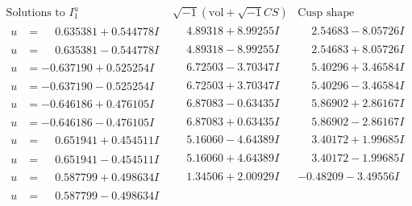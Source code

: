 \documentclass[1p]{elsarticle_modified}
\theoremstyle{definition}
\newcommand{\I}{\sqrt{-1}}
\begin{document}
$$\begin{array}{c|c|c}  
\text{Solutions to }I^u_{1}& \I (\text{vol} + \sqrt{-1}CS) & \text{Cusp shape}\\
 \hline 
\begin{aligned}
u &= \phantom{-}0.635381 + 0.544778 I\end{aligned}
 & \phantom{-}4.89318 + 8.99255 I & \phantom{-}2.54683 - 8.05726 I \\ \hline\begin{aligned}
u &= \phantom{-}0.635381 - 0.544778 I\end{aligned}
 & \phantom{-}4.89318 - 8.99255 I & \phantom{-}2.54683 + 8.05726 I \\ \hline\begin{aligned}
u &= -0.637190 + 0.525254 I\end{aligned}
 & \phantom{-}6.72503 - 3.70347 I & \phantom{-}5.40296 + 3.46584 I \\ \hline\begin{aligned}
u &= -0.637190 - 0.525254 I\end{aligned}
 & \phantom{-}6.72503 + 3.70347 I & \phantom{-}5.40296 - 3.46584 I \\ \hline\begin{aligned}
u &= -0.646186 + 0.476105 I\end{aligned}
 & \phantom{-}6.87083 - 0.63435 I & \phantom{-}5.86902 + 2.86167 I \\ \hline\begin{aligned}
u &= -0.646186 - 0.476105 I\end{aligned}
 & \phantom{-}6.87083 + 0.63435 I & \phantom{-}5.86902 - 2.86167 I \\ \hline\begin{aligned}
u &= \phantom{-}0.651941 + 0.454511 I\end{aligned}
 & \phantom{-}5.16060 - 4.64389 I & \phantom{-}3.40172 + 1.99685 I \\ \hline\begin{aligned}
u &= \phantom{-}0.651941 - 0.454511 I\end{aligned}
 & \phantom{-}5.16060 + 4.64389 I & \phantom{-}3.40172 - 1.99685 I \\ \hline\begin{aligned}
u &= \phantom{-}0.587799 + 0.498634 I\end{aligned}
 & \phantom{-}1.34506 + 2.00929 I & -0.48209 - 3.49556 I \\ \hline\begin{aligned}
u &= \phantom{-}0.587799 - 0.498634 I\end{aligned}

\end{array}$$
\end{document}
